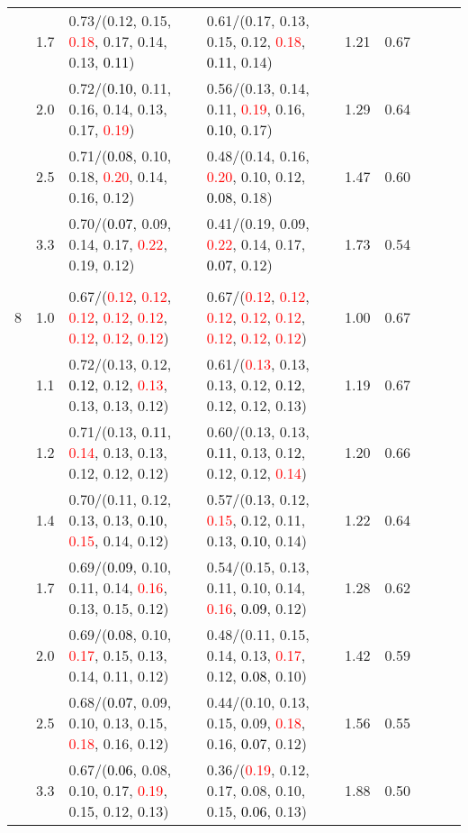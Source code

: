 \documentclass[10pt,a4paper]{report}
\begin{document}
\begin{table}[!htbp]
\begin{center}
{\begin{tabular}{ccllccccc}
			&1.7&0.73/(0.12, 0.15, \textcolor{red}{0.18}, 0.17, 0.14, 0.13, \textcolor{black}{0.11})&0.61/(0.17, 0.13, 0.15, 0.12, \textcolor{red}{0.18}, \textcolor{black}{0.11}, 0.14)&1.21&0.67\\
			&2.0&0.72/(\textcolor{black}{0.10}, 0.11, 0.16, 0.14, 0.13, 0.17, \textcolor{red}{0.19})&0.56/(0.13, 0.14, 0.11, \textcolor{red}{0.19}, 0.16, \textcolor{black}{0.10}, 0.17)&1.29&0.64\\
			&2.5&0.71/(\textcolor{black}{0.08}, 0.10, 0.18, \textcolor{red}{0.20}, 0.14, 0.16, 0.12)&0.48/(0.14, 0.16, \textcolor{red}{0.20}, 0.10, 0.12, \textcolor{black}{0.08}, 0.18)&1.47&0.60\\
			&3.3&0.70/(\textcolor{black}{0.07}, 0.09, 0.14, 0.17, \textcolor{red}{0.22}, 0.19, 0.12)&0.41/(0.19, 0.09, \textcolor{red}{0.22}, 0.14, 0.17, \textcolor{black}{0.07}, 0.12)&1.73&0.54\\
			&&&&\\
			8			&1.0&0.67/(\textcolor{red}{0.12}, \textcolor{red}{0.12}, \textcolor{red}{0.12}, \textcolor{red}{0.12}, \textcolor{red}{0.12}, \textcolor{red}{0.12}, \textcolor{red}{0.12}, \textcolor{red}{0.12})&0.67/(\textcolor{red}{0.12}, \textcolor{red}{0.12}, \textcolor{red}{0.12}, \textcolor{red}{0.12}, \textcolor{red}{0.12}, \textcolor{red}{0.12}, \textcolor{red}{0.12}, \textcolor{red}{0.12})&1.00&0.67\\
			&1.1&0.72/(0.13, 0.12, \textcolor{black}{0.12}, 0.12, \textcolor{red}{0.13}, 0.13, 0.13, 0.12)&0.61/(\textcolor{red}{0.13}, 0.13, 0.13, 0.12, \textcolor{black}{0.12}, 0.12, 0.12, 0.13)&1.19&0.67\\
			&1.2&0.71/(0.13, \textcolor{black}{0.11}, \textcolor{red}{0.14}, 0.13, 0.13, 0.12, 0.12, 0.12)&0.60/(0.13, 0.13, \textcolor{black}{0.11}, 0.13, 0.12, 0.12, 0.12, \textcolor{red}{0.14})&1.20&0.66\\
			&1.4&0.70/(0.11, 0.12, 0.13, 0.13, \textcolor{black}{0.10}, \textcolor{red}{0.15}, 0.14, 0.12)&0.57/(0.13, 0.12, \textcolor{red}{0.15}, 0.12, 0.11, 0.13, \textcolor{black}{0.10}, 0.14)&1.22&0.64\\
			&1.7&0.69/(\textcolor{black}{0.09}, 0.10, 0.11, 0.14, \textcolor{red}{0.16}, 0.13, 0.15, 0.12)&0.54/(0.15, 0.13, 0.11, 0.10, 0.14, \textcolor{red}{0.16}, \textcolor{black}{0.09}, 0.12)&1.28&0.62\\
			&2.0&0.69/(\textcolor{black}{0.08}, 0.10, \textcolor{red}{0.17}, 0.15, 0.13, 0.14, 0.11, 0.12)&0.48/(0.11, 0.15, 0.14, 0.13, \textcolor{red}{0.17}, 0.12, \textcolor{black}{0.08}, 0.10)&1.42&0.59\\
			&2.5&0.68/(\textcolor{black}{0.07}, 0.09, 0.10, 0.13, 0.15, \textcolor{red}{0.18}, 0.16, 0.12)&0.44/(0.10, 0.13, 0.15, 0.09, \textcolor{red}{0.18}, 0.16, \textcolor{black}{0.07}, 0.12)&1.56&0.55\\
			&3.3&0.67/(\textcolor{black}{0.06}, 0.08, 0.10, 0.17, \textcolor{red}{0.19}, 0.15, 0.12, 0.13)&0.36/(\textcolor{red}{0.19}, 0.12, 0.17, 0.08, 0.10, 0.15, \textcolor{black}{0.06}, 0.13)&1.88&0.50\\
			\bottomrule
		\end{tabular}}
	\end{center}
\end{table}
\end{document}
